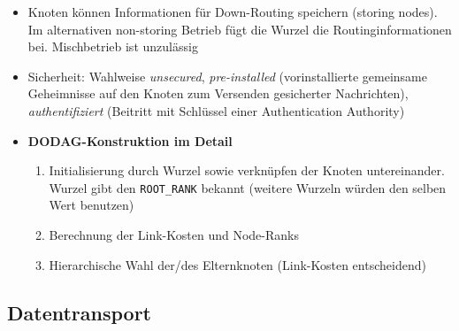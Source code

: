 \begin{itemize}
	\item Knoten können Informationen für Down-Routing speichern (storing nodes). Im alternativen non-storing Betrieb fügt die Wurzel die Routinginformationen bei. Mischbetrieb ist unzulässig
	\item Sicherheit: Wahlweise \textit{unsecured}, \textit{pre-installed} (vorinstallierte gemeinsame Geheimnisse auf den Knoten zum Versenden gesicherter Nachrichten), \textit{authentifiziert} (Beitritt mit Schlüssel einer Authentication Authority)
	\item \textbf{DODAG-Konstruktion im Detail}
	\begin{enumerate}
		\item Initialisierung durch Wurzel sowie verknüpfen der Knoten untereinander. Wurzel gibt den \texttt{ROOT\_RANK} bekannt (weitere Wurzeln würden den selben Wert benutzen)
		\item Berechnung der Link-Kosten und Node-Ranks
		\item Hierarchische Wahl der/des Elternknoten (Link-Kosten entscheidend)
	\end{enumerate}
\end{itemize}


\subsection{Datentransport}


